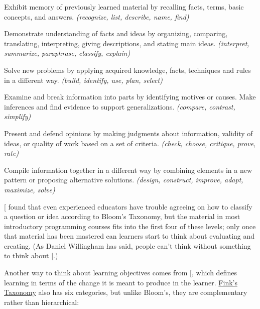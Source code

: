 \begin{description}
\tightlist
\item[Remembering:]
Exhibit memory of previously learned material by recalling facts,
terms, basic concepts, and answers. \emph{(recognize, list, describe,
name, find)}
\item[Understanding:]
Demonstrate understanding of facts and ideas by organizing,
comparing, translating, interpreting, giving descriptions, and
stating main ideas. \emph{(interpret, summarize, paraphrase, classify,
explain)}
\item[Applying:]
Solve new problems by applying acquired knowledge, facts, techniques
and rules in a different way. \emph{(build, identify, use, plan, select)}
\item[Analyzing:]
Examine and break information into parts by identifying motives or
causes. Make inferences and find evidence to support
generalizations. \emph{(compare, contrast, simplify)}
\item[Evaluating:]
Present and defend opinions by making judgments about information,
validity of ideas, or quality of work based on a set of criteria.
\emph{(check, choose, critique, prove, rate)}
\item[Creating:]
Compile information together in a different way by combining
elements in a new pattern or proposing alternative solutions.
\emph{(design, construct, improve, adapt, maximize, solve)}
\end{description}

{[}\protect[\hyperlink{b:Masa2018}{Masa2018}]{]} found that even experienced educators have trouble
agreeing on how to classify a question or idea according to Bloom's
Taxonomy, but the material in most introductory programming courses
fits into the first four of these levels; only once that material has
been mastered can learners start to think about evaluating and
creating. (As Daniel Willingham has said, people can't think without
something to think about {[}\protect[\hyperlink{b:Will2010}{Will2010}]{]}.)

Another way to think about learning objectives comes from
{[}\protect[\hyperlink{b:Fink2013}{Fink2013}]{]}, which defines learning in terms of the change it
is meant to produce in the learner. \protect\hyperlink{g:finks-taxonomy}{Fink's
Taxonomy} also has six categories, but unlike
Bloom's, they are complementary rather than hierarchical:

